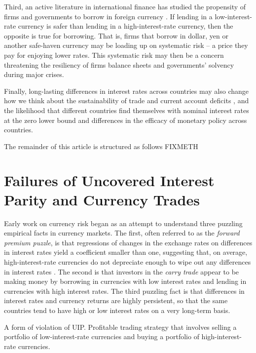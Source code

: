 \documentclass{ar-1col}
\begin{document}
Third, an active literature in international finance has studied the propensity of firms and governments to borrow in foreign currency \citep{cespedes2004balance,du2016sovereign}. If lending in a low-interest-rate currency is safer than lending in a high-interest-rate currency, then the opposite is true for borrowing. That is, firms that borrow in dollar, yen or another safe-haven currency may be loading up on systematic risk -- a price they pay for enjoying lower rates. This systematic risk may then be a concern threatening the resiliency of firms balance sheets and governments' solvency during major crises.

Finally, long-lasting differences in interest rates across countries may also change how we think about the sustainability of trade and current account deficits \citep{GourinchasRey2007}, and the likelihood that different countries find themselves with nominal interest rates at the zero lower bound and differences in the efficacy of monetary policy across countries.

The remainder of this article is structured as follows FIXMETH


\section{Failures of
  Uncovered Interest Parity and Currency Trades \label{sec_UIP}}

Early work on currency risk began as an attempt to understand three puzzling empirical facts in currency markets. The first, often referred to as the \textit{forward premium puzzle}, is that regressions of changes in the exchange rates on differences in interest rates yield a coefficient smaller than one, suggesting that, on average, high-interest-rate currencies do not depreciate enough to wipe out any differences in interest rates \citep{Bilson1981, Fama1984}. The second is that investors in the \textit{carry trade} appear to be making money by borrowing in currencies with low interest rates and lending in currencies with high interest rates. The third puzzling fact is that differences in interest rates and currency returns are highly persistent, so that the same countries tend to have high or low interest rates on a very long-term basis.

\begin{marginnote}[]
    
   {A form of violation of UIP. Profitable trading strategy that involves selling a portfolio of low-interest-rate currencies and buying a portfolio of high-interest-rate currencies.} 
\end{marginnote}
\end{document}
